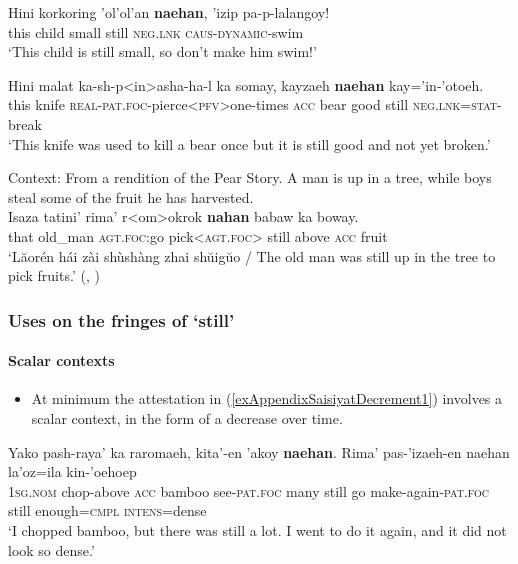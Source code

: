 \begin{exe}
	\ex\label{exAppendixSaisiyat1}
	\gll Hini korkoring 'ol'ol'an \textbf{naehan}, 'izip pa-p-lalangoy!\\
	this child small still \textsc{neg}.\textsc{lnk} \textsc{caus}-\textsc{dynamic}-swim\\
	\glt \lq This child is still small, so don't make him swim!\rq{ }\parencite[265]{ZeitounEtal2015}

	\ex\label{exAppendixSaisiyat2}
	\gll Hini malat ka-sh-p<in>asha-ha-l ka somay, kayzaeh \textbf{naehan} kay='in-'otoeh.\\
	this knife \textsc{real}-\textsc{pat}.\textsc{foc}-pierce<\textsc{pfv}>one-times \textsc{acc} bear good still \textsc{neg}.\textsc{lnk}=\textsc{stat}-break\\

	\glt \lq This knife was used to kill a bear once but it is still good and not yet broken.' \parencite[574]{ZeitounEtal2015}

	\ex\label{exAppendixSaisiyat3}
	Context: From a rendition of the Pear Story. A man is up in a tree, while boys steal some of the fruit he has harvested.\\
	\gll Isaza tatini' rima' r<om>okrok \textbf{nahan} babaw ka boway.\\
	that old\_man \textsc{agt}.\textsc{foc}:go pick<\textsc{agt}.\textsc{foc}> still above \textsc{acc} fruit\\
	\glt \lq Lăorén hái zài shùshàng zhai shŭigŭo / The old man was still up in the tree to pick fruits.\rq{ }(\cite[589]{Huang2007}, \citeyear[110]{Huang2008})
\end{exe}

\subsubsection{Uses on the fringes of \lq{}still\rq{}}
\paragraph{Scalar contexts}\label{appendixSaisiyatScalar}
\begin{itemize}
	\item At minimum the attestation in (\ref{exAppendixSaisiyatDecrement1}) involves a scalar context, in the form of a decrease over time.
\end{itemize}

\begin{exe}
	\ex \label{exAppendixSaisiyatDecrement1}
	\gll Yako pash-raya' ka raromaeh, kita'-en 'akoy \textbf{naehan}. Rima' pas-'izaeh-en naehan la'oz=ila kin-'oehoep\\
	1\textsc{sg}.\textsc{nom} chop-above \textsc{acc} bamboo see-\textsc{pat}.\textsc{foc} many still go make-again-\textsc{pat}.\textsc{foc} still enough=\textsc{cmpl} \textsc{intens}=dense\\
	\glt \lq I chopped bamboo, but there was still a lot. I went to do it again, and it did not look so dense.' \parencite[586]{ZeitounEtal2015}
\end{exe}

